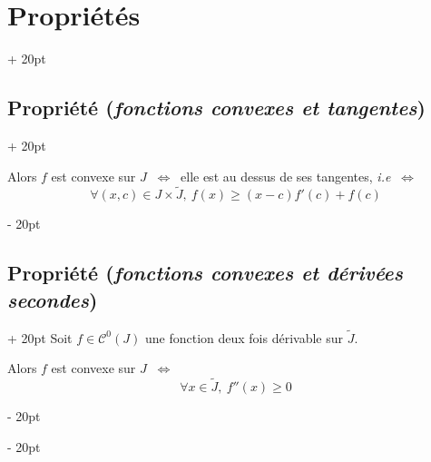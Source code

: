 \documentclass[a4paper, 12pt, twoside]{article}
\newcommand{\ssi}{\ \Leftrightarrow \ }
\renewcommand{\ge}{\geqslant}
\newcommand{\ind}[1][20pt]{\advance\leftskip + #1}
\newcommand{\deind}[1][20pt]{\advance\leftskip - #1}
\newenvironment{indt}[2][20pt]{#2 \par \ind[#1]}{\par \deind} %
\begin{document}
\begin{indt}{\section{Propriétés}}
\begin{indt}{\subsection{Propriété (\textit{fonctions convexes et tangentes})}}
            \vspace{6pt}
            
            Alors $f$ est convexe sur $J$ $\ssi$ elle est au dessus de ses tangentes, \textit{i.e} $\ssi$
            \[
                \forall (x, c) \in J \times \widetilde J,\ 
                f(x) \ge (x - c)f'(c) + f(c)
            \]
        \end{indt}

        \vspace{12pt}
        
        \begin{indt}{\subsection{Propriété (\textit{fonctions convexes et dérivées secondes})}}
            Soit $f \in \mathcal C^0(J)$ une fonction deux fois dérivable sur $\widetilde J$.

            \vspace{6pt}
            
            Alors $f$ est convexe sur $J$ $\ssi$
            \[
                \forall x \in \widetilde J,\ f''(x) \ge 0
            \]
        \end{indt}
    \end{indt}
    
    
    
\end{document}
